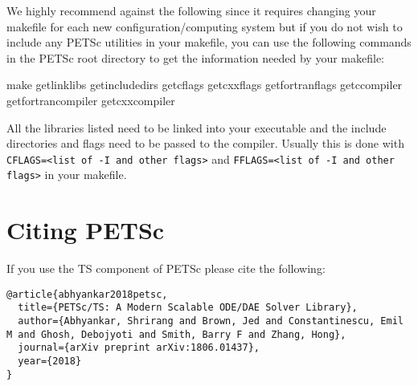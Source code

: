 We highly recommend against the following since it requires changing your makefile for each new configuration/computing system but
if you do not wish to include any PETSc utilities in your makefile,
you can use the following commands in the PETSc root directory to get the information
needed by your makefile:
\begin{bashlisting}
make getlinklibs getincludedirs getcflags getcxxflags getfortranflags getccompiler getfortrancompiler getcxxcompiler
\end{bashlisting}
All the libraries listed need to be linked into your executable and the
include directories and flags need to be passed to the compiler.
Usually this is done with \lstinline{CFLAGS=<list of -I and other flags>} and
\lstinline{FFLAGS=<list of -I and other flags>} in your makefile.


\section{Citing PETSc}

If you use the TS component of PETSc please cite the following:

\begin{verbatim}
@article{abhyankar2018petsc,
  title={PETSc/TS: A Modern Scalable ODE/DAE Solver Library},
  author={Abhyankar, Shrirang and Brown, Jed and Constantinescu, Emil M and Ghosh, Debojyoti and Smith, Barry F and Zhang, Hong},
  journal={arXiv preprint arXiv:1806.01437},
  year={2018}
}
\end{verbatim}

